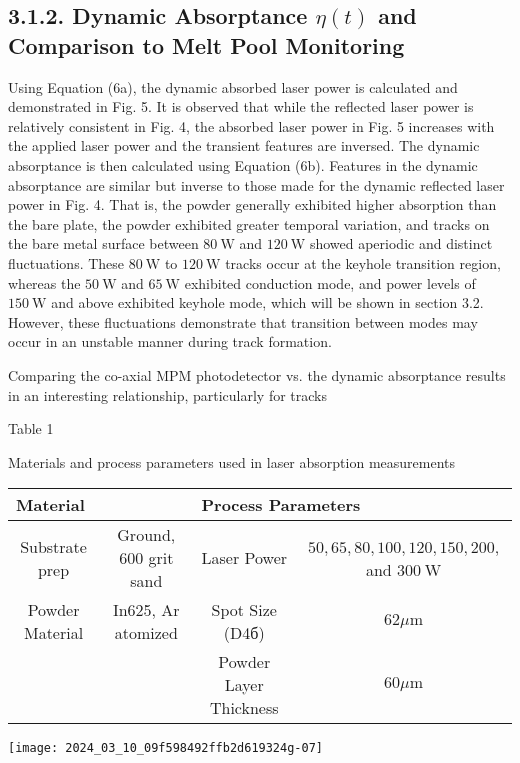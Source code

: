 \documentclass[10pt]{article}
\begin{document}
\subsection*{3.1.2. Dynamic Absorptance $\eta(t)$ and Comparison to Melt Pool Monitoring}
Using Equation (6a), the dynamic absorbed laser power is calculated and demonstrated in Fig. 5. It is observed that while the reflected laser power is relatively consistent in Fig. 4, the absorbed laser power in Fig. 5 increases with the applied laser power and the transient features are inversed. The dynamic absorptance is then calculated using Equation (6b). Features in the dynamic absorptance are similar but inverse to those made for the dynamic reflected laser power in Fig. 4. That is, the powder generally exhibited higher absorption than the bare plate, the powder exhibited greater temporal variation, and tracks on the bare metal surface between $80 \mathrm{~W}$ and $120 \mathrm{~W}$ showed aperiodic and distinct fluctuations. These $80 \mathrm{~W}$ to $120 \mathrm{~W}$ tracks occur at the keyhole transition region, whereas the $50 \mathrm{~W}$ and $65 \mathrm{~W}$ exhibited conduction mode, and power levels of $150 \mathrm{~W}$ and above exhibited keyhole mode, which will be shown in section 3.2. However, these fluctuations demonstrate that transition between modes may occur in an unstable manner during track formation.

Comparing the co-axial MPM photodetector vs. the dynamic absorptance results in an interesting relationship, particularly for tracks

Table 1

Materials and process parameters used in laser absorption measurements

\begin{center}
\begin{tabular}{|c|c|c|c|}
\hline
\multicolumn{2}{|l|}{Material} & \multicolumn{2}{|l|}{Process Parameters} \\
\hline
Substrate prep & Ground, 600 grit sand & Laser Power & $50,65,80,100,120,150,200$, and $300 \mathrm{~W}$ \\
\hline
Powder Material & In625, Ar atomized & Spot Size (D4б) & $62 \mu \mathrm{m}$ \\
\hline
 &  & Powder Layer Thickness & $60 \mu \mathrm{m}$ \\
\hline
\end{tabular}
\end{center}

\begin{center}
\texttt{[image: 2024\_03\_10\_09f598492ffb2d619324g-07]}
\end{center}
\end{document}
